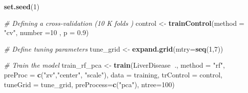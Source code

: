 \documentclass[]{article}
\newenvironment{Shaded}{\begin{snugshade}}{\end{snugshade}}
\newcommand{\CommentTok}[1]{\textcolor[rgb]{0.56,0.35,0.01}{\textit{#1}}}
\newcommand{\DataTypeTok}[1]{\textcolor[rgb]{0.13,0.29,0.53}{#1}}
\newcommand{\DecValTok}[1]{\textcolor[rgb]{0.00,0.00,0.81}{#1}}
\newcommand{\FloatTok}[1]{\textcolor[rgb]{0.00,0.00,0.81}{#1}}
\newcommand{\KeywordTok}[1]{\textcolor[rgb]{0.13,0.29,0.53}{\textbf{#1}}}
\newcommand{\NormalTok}[1]{#1}
\newcommand{\OperatorTok}[1]{\textcolor[rgb]{0.81,0.36,0.00}{\textbf{#1}}}
\newcommand{\StringTok}[1]{\textcolor[rgb]{0.31,0.60,0.02}{#1}}
\begin{document}
\begin{Shaded}
\begin{Highlighting}[]
\KeywordTok{set.seed}\NormalTok{(}\DecValTok{1}\NormalTok{)}

\CommentTok{# Defining a cross-validation (10 K folds )}
\NormalTok{control <-}\StringTok{ }\KeywordTok{trainControl}\NormalTok{(}\DataTypeTok{method =} \StringTok{"cv"}\NormalTok{, }\DataTypeTok{number =}\DecValTok{10}\NormalTok{ , }\DataTypeTok{p =} \FloatTok{0.9}\NormalTok{)}

\CommentTok{# Define tuning parameters}
\NormalTok{tune_grid <-}\StringTok{ }\KeywordTok{expand.grid}\NormalTok{(}\DataTypeTok{mtry=}\KeywordTok{seq}\NormalTok{(}\DecValTok{1}\NormalTok{,}\DecValTok{7}\NormalTok{))}

\CommentTok{# Train the model}
\NormalTok{train_rf_pca <-}\StringTok{ }\KeywordTok{train}\NormalTok{(LiverDisease}\OperatorTok{~}\NormalTok{.,}
                     \DataTypeTok{method =} \StringTok{"rf"}\NormalTok{,}
                     \DataTypeTok{preProc =} \KeywordTok{c}\NormalTok{(}\StringTok{"zv"}\NormalTok{,}\StringTok{"center"}\NormalTok{, }\StringTok{"scale"}\NormalTok{),}
                     \DataTypeTok{data =}\NormalTok{ training,}
                     \DataTypeTok{trControl =}\NormalTok{ control,}
                     \DataTypeTok{tuneGrid =}\NormalTok{ tune_grid,}
                     \DataTypeTok{preProcess=}\KeywordTok{c}\NormalTok{(}\StringTok{"pca"}\NormalTok{),}
                     \DataTypeTok{ntree=}\DecValTok{100}\NormalTok{)}
\end{Highlighting}
\end{Shaded}
\end{document}
